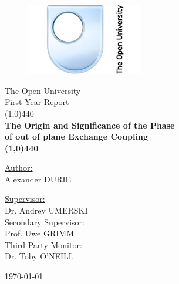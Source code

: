 \documentclass[a4paper, 12pt]{article}
\author{Alexander Durie}
\begin{document}
	\begin{titlepage}
		\begin{figure}[H]
			\centering
			\includegraphics[width=2in]{OU_logo.jpg}
		\end{figure}
		\begin{center}
			\vspace{2cm}
			\huge{The Open University}\\[1.5cm]
			\Large
			First Year Report\\[4mm]
			\linethickness{1pt}\line(1,0){440}
			\\
			\LARGE\bf The Origin and Significance of the Phase\\ of out of plane Exchange Coupling
			\\[-4mm]

			\line(1,0){440}
		\end{center}
		\begin{multicols}{2}
			\justify \underline{Author:}\\[1mm]
			\footnotesize Alexander DURIE\\[17mm]
			\begin{flushright}
				\normalsize\underline{Supervisor:}\\[1mm]
				\footnotesize{Dr. Andrey UMERSKI}\\[3mm]
				\normalsize\underline{Secondary Supervisor:}\\[1mm]
				\footnotesize Prof. Uwe GRIMM\\[3mm]
				\normalsize\underline{Third Party Monitor:}\\[1mm]
				\footnotesize Dr. Toby O'NEILL
			\end{flushright}
		\end{multicols}
		\vspace{5cm}
		\large\centering\today
	\end{titlepage}
	\newpage
	\tableofcontents

	\newpage
	\printglossary[title=List of Abbreviations]
	\newpage
\end{document}
